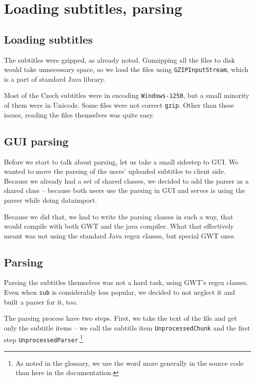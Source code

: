 
\section{Loading subtitles, parsing}
\subsection*{Loading subtitles}
The subtitles were gzipped, as already noted. Gunzipping all the files to disk would take unnecessary space, so we load the files using \texttt{GZIPInputStream}, which is a part of standard Java library.

Most of the Czech subtitles were in encoding \texttt{Windows-1250}, but a small minority of them were in Unicode. Some files were not correct \texttt{gzip}. Other than these issues, reading the files themselves was quite easy.

\subsection*{GUI parsing}
Before we start to talk about parsing, let us take a small sidestep to GUI. We wanted to move the parsing of the users' uploaded subtitles to client side. Because we already had a set of shared classes, we decided to add the parser as a shared class -- because both users use the parsing in GUI and serves is using the parser while doing dataimport.

Because we did that, we had to write the parsing classes in such a way, that would compile with both GWT and the java compiler. What that effectively meant was not using the standard Java regex classes, but special GWT ones.

\subsection*{Parsing}
Parsing the subtitles themselves was not a hard task, using GWT's regex classes. Even when \texttt{sub} is considerably less popular, we decided to not neglect it and built a parser for it, too.

The parsing process have two steps. First, we take the text of the file and get only the subtitle items -- we call the subtitle item \texttt{UnprocessedChunk} and the first step \texttt{UnprocessedParser}.\footnote{As noted in the glossary, we use the word  more generally in the source code than here in the documentation.} 

